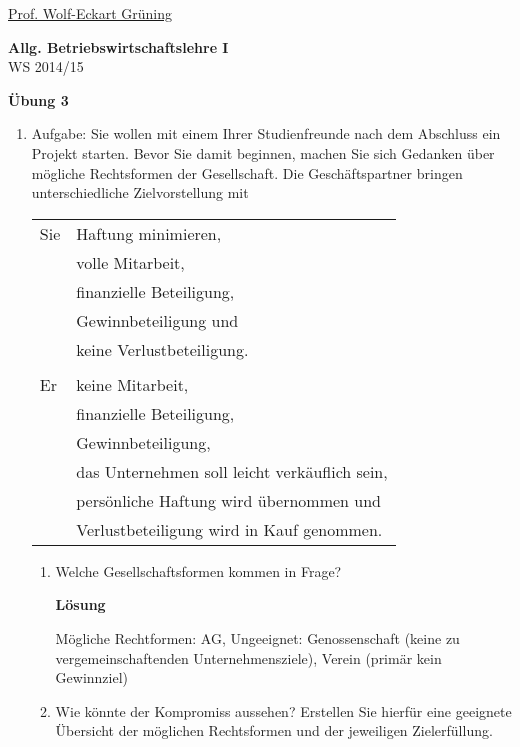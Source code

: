 \documentclass[12pt,a4paper]{scrreprt}
\newcommand{\Lsg}{\textbf{Lösung}\nobreak}
\begin{document}
 
\begin{flushleft}
\href{mailto:gruening@informatik.htw-dresden.de}{Prof. Wolf-Eckart Grüning}
\end{flushleft}

\begin{center}
\large{\textbf{ Allg. Betriebswirtschaftslehre I}} \\
WS 2014/15 \end{center}

\begin{center}\large{\textbf{ Übung 3 }} \end{center}

\bigskip
\begin{enumerate}%

 	\item{Aufgabe:}
 	Sie wollen mit einem Ihrer Studienfreunde nach dem Abschluss ein Projekt starten. Bevor Sie damit
beginnen, machen Sie sich Gedanken über mögliche Rechtsformen der Gesellschaft. Die
Geschäftspartner bringen unterschiedliche Zielvorstellung mit

	\begin{tabular}{ll}
	Sie 
		& Haftung minimieren, \\
		& volle Mitarbeit, \\
		& finanzielle Beteiligung, \\
		& Gewinnbeteiligung und \\
		& keine Verlustbeteiligung. \\
\\
	Er
		& keine Mitarbeit, \\
		& finanzielle Beteiligung, \\
		& Gewinnbeteiligung, \\
		& das Unternehmen soll leicht verkäuflich sein, \\
		& persönliche Haftung wird übernommen und \\
		& Verlustbeteiligung wird in Kauf genommen.
	\end{tabular}

	\begin{enumerate} 
		\item Welche Gesellschaftsformen kommen in Frage?

\Lsg

Mögliche Rechtformen: AG, 
Ungeeignet: Genossenschaft (keine zu vergemeinschaftenden Unternehmensziele), Verein (primär kein Gewinnziel)

		\item Wie könnte der Kompromiss aussehen? Erstellen Sie hierfür eine geeignete Übersicht der
möglichen Rechtsformen und der jeweiligen Zielerfüllung.


\end{enumerate}
\end{enumerate}
\end{document}
